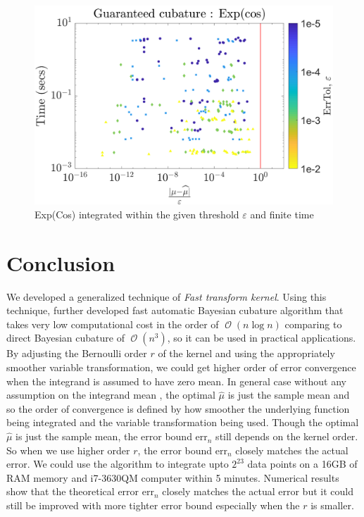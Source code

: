 \documentclass[twocolumn]{svjour3}          %
\DeclareMathOperator{\Order}{{\mathcal O}}
\newcommand{\hmu}{\widehat{\mu}}
\newcommand{\errn}{\text{err}_{n}}
\begin{document}
\begin{figure}
	\centering
	\includegraphics[width=0.95\linewidth]{"figures/Exp(cos) guaranteed 19-Jul-2018 08-14-22"}
	\caption[Guaranteed:]{Exp(Cos) integrated within the given threshold $\varepsilon$ and finite time}
	\label{fig:ExpCos-guaranteed}
\end{figure}











\section{Conclusion}


We developed a generalized technique of \emph{Fast transform kernel}. Using this technique, further developed fast automatic Bayesian cubature algorithm that takes very low computational cost in the order of $\Order(n \log n)$ comparing to direct Bayesian cubature of $\Order(n^{3})$, so it can be used in practical applications. 
By adjusting the Bernoulli order $r$ of the kernel and using the appropriately smoother variable transformation, we could get 
higher order of error convergence when the integrand is assumed to have zero mean. 
In general case without any assumption on the integrand mean
, the optimal $\hmu$ is just the sample mean and so the order of convergence is defined by how smoother the underlying function being integrated and the variable transformation being used. 
Though the optimal $\hmu$ is just the sample mean, the error bound $\errn$ still depends on the kernel order.
So when we use higher order $r$, the error bound $\errn$ closely matches the actual error.
We could use the algorithm to integrate upto $2^{23}$ data points on a 16GB of RAM memory and i7-3630QM computer within 5 minutes. 
Numerical results show that the theoretical error $\errn$ closely matches the actual error but it could still be improved with more tighter error bound especially when the $r$ is smaller.
\end{document}
